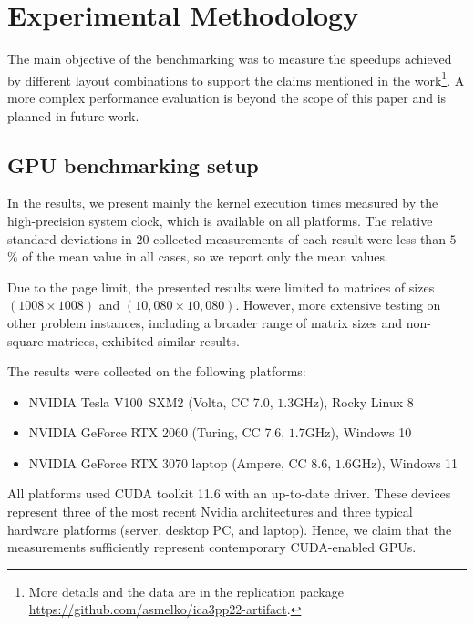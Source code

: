 \section{Experimental Methodology}\label{appendix:methodology}

The main objective of the benchmarking was to measure the speedups achieved by different layout combinations to support the claims mentioned in the work\footnote{More details and the data are in the replication package \url{https://github.com/asmelko/ica3pp22-artifact}.}. A more complex performance evaluation is beyond the scope of this paper and is planned in future work.

\subsection{GPU benchmarking setup}

In the results, we present mainly the kernel execution times measured by the high-precision system clock, which is available on all platforms. The relative standard deviations in $20$ collected measurements of each result were less than $5$\% of the mean value in all cases, so we report only the mean values.

Due to the page limit, the presented results were limited to matrices of sizes $(1008\times 1008)$ and $(10,080\times 10,080)$. However, more extensive testing on other problem instances, including a broader range of matrix sizes and non-square matrices, exhibited similar results.

The results were collected on the following platforms:
\begin{itemize}
    \item NVIDIA Tesla V100~SXM2 (Volta, CC 7.0, $1.3$GHz), Rocky Linux 8
    \item NVIDIA GeForce RTX 2060 (Turing, CC 7.6, $1.7$GHz), Windows 10
    \item NVIDIA GeForce RTX 3070 laptop (Ampere, CC 8.6, $1.6$GHz), Windows 11
\end{itemize}

All platforms used CUDA toolkit 11.6 with an up-to-date driver. These devices represent three of the most recent Nvidia architectures and three typical hardware platforms (server, desktop PC, and laptop). Hence, we claim that the measurements sufficiently represent contemporary CUDA-enabled GPUs.


